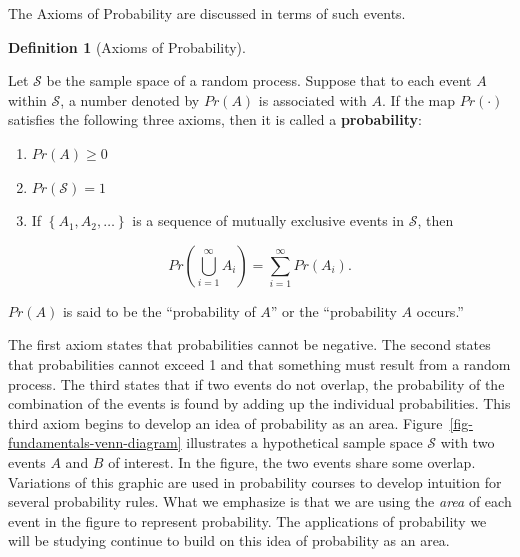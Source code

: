 \documentclass[
  letterpaper,
  DIV=11,
  numbers=noendperiod]{scrreprt}
\providecommand{\tightlist}{%
  \setlength{\itemsep}{0pt}\setlength{\parskip}{0pt}}\usepackage{longtable,booktabs,array}
\theoremstyle{definition}
\newtheorem{definition}{Definition}[chapter]
\theoremstyle{plain}
\theoremstyle{definition}
\theoremstyle{remark}
\begin{document}
The Axioms of Probability are discussed in terms of such events.

\begin{definition}[Axioms of
Probability]\protect\hypertarget{def-axioms}{}\label{def-axioms}

Let \(\mathcal{S}\) be the sample space of a random process. Suppose
that to each event \(A\) within \(\mathcal{S}\), a number denoted by
\(Pr(A)\) is associated with \(A\). If the map \(Pr(\cdot)\) satisfies
the following three axioms, then it is called a \textbf{probability}:

\begin{enumerate}
\def\labelenumi{\arabic{enumi}.}
\tightlist
\item
  \(Pr(A) \geq 0\)
\item
  \(Pr(\mathcal{S}) = 1\)
\item
  If \(\left\{A_1, A_2, \dotsc\right\}\) is a sequence of mutually
  exclusive events in \(\mathcal{S}\), then
\end{enumerate}

\[Pr\left(\bigcup_{i = 1}^{\infty} A_i\right) = \sum_{i = 1}^{\infty} Pr\left(A_i\right).\]

\(Pr(A)\) is said to be the ``probability of \(A\)'' or the
``probability \(A\) occurs.''

\end{definition}

The first axiom states that probabilities cannot be negative. The second
states that probabilities cannot exceed 1 and that something must result
from a random process. The third states that if two events do not
overlap, the probability of the combination of the events is found by
adding up the individual probabilities. This third axiom begins to
develop an idea of probability as an area.
Figure~\ref{fig-fundamentals-venn-diagram} illustrates a hypothetical
sample space \(\mathcal{S}\) with two events \(A\) and \(B\) of
interest. In the figure, the two events share some overlap. Variations
of this graphic are used in probability courses to develop intuition for
several probability rules. What we emphasize is that we are using the
\emph{area} of each event in the figure to represent probability. The
applications of probability we will be studying continue to build on
this idea of probability as an area.
\end{document}
